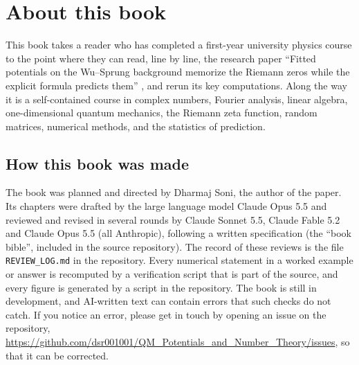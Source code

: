 \frontmatter
\begin{titlepage}
\thispagestyle{empty}
\end{titlepage}
\chapter*{About this book}
This book takes a reader who has completed a first-year university physics course to the point where they can read, line by line, the research paper ``Fitted potentials on the Wu--Sprung background memorize the Riemann zeros while the explicit formula predicts them'' \cite{soniR1}, and rerun its key computations. Along the way it is a self-contained course in complex numbers, Fourier analysis, linear algebra, one-dimensional quantum mechanics, the Riemann zeta function, random matrices, numerical methods, and the statistics of prediction.

\section*{How this book was made}
The book was planned and directed by Dharmaj Soni, the author of the paper. Its chapters were drafted by the large language model Claude Opus 5.5 and reviewed and revised in several rounds by Claude Sonnet 5.5, Claude Fable 5.2 and Claude Opus 5.5 (all Anthropic), following a written specification (the ``book bible'', included in the source repository). The record of these reviews is the file \texttt{REVIEW\_LOG.md} in the repository. Every numerical statement in a worked example or answer is recomputed by a verification script that is part of the source, and every figure is generated by a script in the repository. The book is still in development, and AI-written text can contain errors that such checks do not catch. If you notice an error, please get in touch by opening an issue on the repository, \url{https://github.com/dsr001001/QM_Potentials_and_Number_Theory/issues}, so that it can be corrected.

